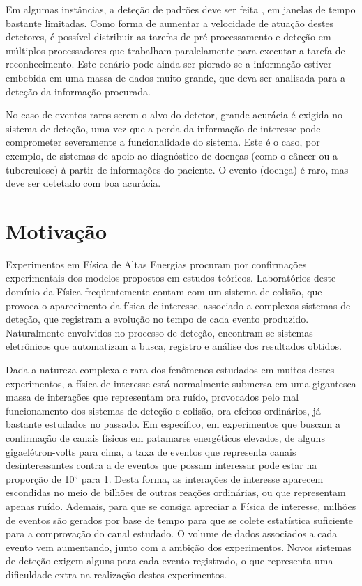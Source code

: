 Em algumas instâncias, a deteção de padrões deve ser feita , em
janelas de tempo bastante limitadas. Como forma de aumentar a velocidade de
atuação destes detetores, é possível distribuir as tarefas de
pré-processamento e deteção em múltiplos processadores que trabalham
paralelamente para executar a tarefa de reconhecimento. Este cenário pode
ainda ser piorado se a informação estiver embebida em uma massa de dados muito
grande, que deva ser analisada para a deteção da informação procurada.

No caso de eventos raros serem o alvo do detetor, grande acurácia é exigida no
sistema de deteção, uma vez que a perda da informação de interesse pode
comprometer severamente a funcionalidade do sistema. Este é o caso, por
exemplo, de sistemas de apoio ao diagnóstico de doenças (como o câncer ou a
tuberculose) à partir de informações do paciente. O evento (doença) é raro,
mas deve ser detetado com boa acurácia.

\section{Motivação}

Experimentos em Física de Altas Energias procuram por confirmações
experimentais dos modelos propostos em estudos teóricos. Laboratórios deste
domínio da Física freqüentemente contam com um sistema de colisão, que provoca
o aparecimento da física de interesse, associado a complexos sistemas de
deteção, que registram a evolução no tempo de cada evento
produzido. Naturalmente envolvidos no processo de deteção, encontram-se
sistemas eletrônicos que automatizam a busca, registro e análise dos
resultados obtidos.

Dada a natureza complexa e rara dos fenômenos estudados em muitos destes
experimentos, a física de interesse está normalmente submersa em uma
gigantesca massa de interações que representam ora ruído, provocados pelo mal
funcionamento dos sistemas de deteção e colisão, ora efeitos ordinários, já
bastante estudados no passado. Em específico, em experimentos que buscam a
confirmação de canais físicos em patamares energéticos elevados, de alguns
gigaelétron-volts para cima, a taxa de eventos que representa canais
desinteressantes contra a de eventos que possam interessar pode estar na
proporção de 10$^9$ para 1. Desta forma, as interações de interesse aparecem
escondidas no meio de bilhões de outras reações ordinárias, ou que representam
apenas ruído. Ademais, para que se consiga apreciar a Física de interesse,
milhões de eventos são gerados por base de tempo para que se colete
estatística suficiente para a comprovação do canal estudado. O volume de dados
associados a cada evento vem aumentando, junto com a ambição dos
experimentos. Novos sistemas de deteção exigem alguns  para
cada evento registrado, o que representa uma dificuldade extra na realização
destes experimentos.

